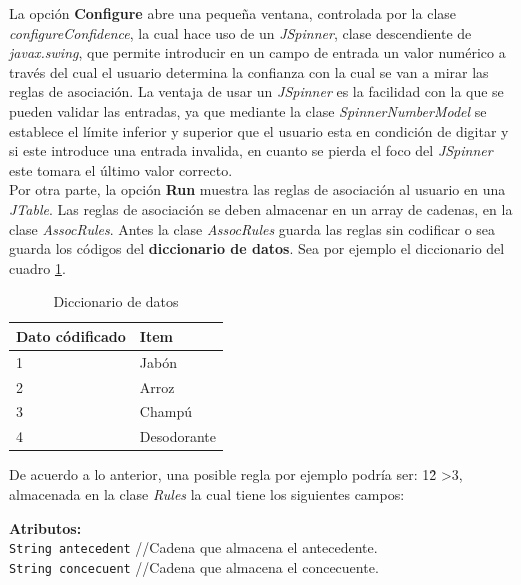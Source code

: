 La opci\'on \textbf{Configure} abre una peque\~na ventana, controlada por la clase \textit{configureConfidence},
la cual hace uso de un \textit{JSpinner}, clase descendiente de \textit{javax.swing}, que permite introducir en un
campo de entrada un valor num\'erico a trav\'es del cual el usuario determina la confianza con la cual se van a
mirar las reglas de asociaci\'on. La ventaja de usar un \textit{JSpinner} es la facilidad con la que se pueden
validar las entradas, ya que mediante la clase \textit{SpinnerNumberModel} se establece el l\'imite inferior y
superior que el usuario esta en condici\'on de digitar y si este introduce una entrada invalida, en cuanto se
pierda el foco del \textit{JSpinner} este tomara el \'ultimo valor correcto.\\ 

Por otra parte, la opci\'on \textbf{Run} muestra las reglas de asociaci\'on al usuario en una \textit{JTable}. Las
reglas de asociaci\'on se deben almacenar en un array de cadenas, en la clase \textit{AssocRules}. Antes la clase
\textit{AssocRules} guarda las reglas sin codificar o sea guarda los c\'odigos del \textbf{diccionario de datos}.
Sea por ejemplo el diccionario del cuadro \ref{trules1}.\\

\begin{table}[t]
\begin{center}
\begin{tabular}{|p{15mm}|p{25mm}|}\hline
\textbf{Dato c\'odificado} & \textbf{Item}\\ \hline\hline
1 & Jab\'on\\ \hline
2 & Arroz\\ \hline
3 & Champ\'u\\ \hline
4 & Desodorante\\ \hline
\end{tabular}
\end{center}
\caption{Diccionario de datos}
\label{trules1}
\end{table}

De acuerdo a lo anterior, una posible regla por ejemplo podr\'ia ser: 1\^ 2\- >3, almacenada en la clase
\textit{Rules} la cual tiene los siguientes campos:\\

\begin{footnotesize}
\textbf{Atributos:\\}
\texttt{String antecedent} //Cadena que almacena el antecedente.\\
\texttt{String concecuent} //Cadena que almacena el concecuente.\\
\end{footnotesize}


